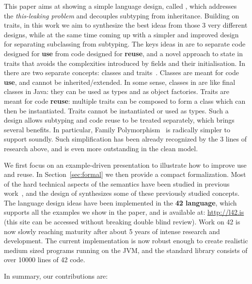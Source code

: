 This paper aims at showing a simple language design, called \name,
which addresses the \emph{this-leaking problem} and decouples subtyping from inheritance.
Building on traits, in this work we aim to synthesize the best ideas
from those 3 very different designs, while at the same time coming up with a simpler and
improved design for separating subclassing from subtyping.
The keys ideas in \name are to separate code designed for
\textbf{use} from code designed for \textbf{reuse}, and a novel
approach to state in traits that avoids the complexities introduced by
fields and their initialisation.
In \name there are two separate concepts: classes
and traits~\cite{ducasse2006traits}. Classes are meant for code \textbf{use}, and cannot be inherited/extended. In
some sense, classes in \name are like final classes in
Java: they can be used as types and as object factories. Traits are meant for code \textbf{reuse}: multiple traits can be
composed to form a class which can then be instantiated. Traits 
cannot be instantiated or used as types. Such a design allows
subtyping and code reuse to be treated separately, which brings several benefits. In particular, 
Family Polymorphism~\cite{ernst2004expression} is
radically simpler to support soundly.
Such simplification has been already recognized by the 3 lines of
research above, and is even more outstanding in the clean \name model.

We first focus on an example-driven presentation to illustrate how to
improve use and reuse. 
In Section~\ref{sec:formal} we then provide a compact formalization.
Most of the hard technical aspects of the
semantics have been studied in previous 
work~\cite{Bettini:2010:ISP:1774088.1774530,BETTINI2013521,Bettini2015282,KrogdahlMS09,DBLP:journals/taosd/AxelsenSKM12,DBLP:conf/gpce/AxelsenK12,deep,servetto2014meta,fjig},
and the design of \name synthesizes some of these previously studied
concepts.
The language design ideas have been implemented in the {\bf 42 language}, which supports all
the examples we show in the paper, and is available at: \url{http://l42.is} (this site can be accessed without breaking double blind review).
Work on 42 is now slowly reaching maturity after about 5 years of
intense research and development. The current implementation 
is now robust enough to create realistic medium sized programs running 
on the JVM, and the standard library consists of over 10000 lines of
42 code. 

In summary, our contributions are:

